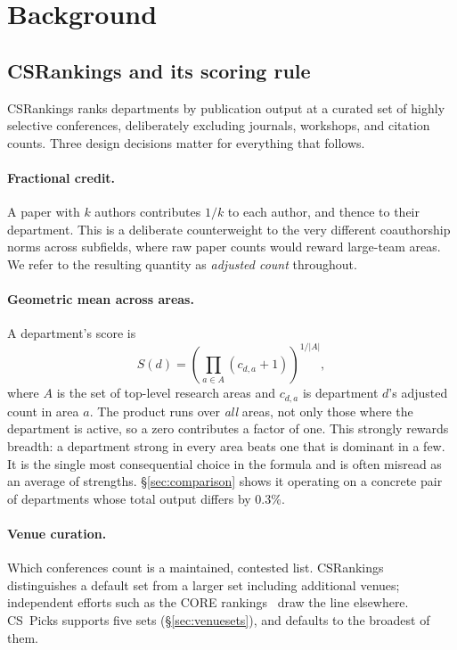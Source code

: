 \documentclass[11pt]{article}
\newcommand{\sys}{CS~Picks}
\newcommand{\csr}{CSRankings}
\begin{document}
\section{Background}
\label{sec:background}

\subsection{\csr{} and its scoring rule}

\csr{} ranks departments by publication output at a curated set of highly
selective conferences, deliberately excluding journals, workshops, and citation
counts. Three design decisions matter for everything that follows.

\paragraph{Fractional credit.} A paper with $k$ authors contributes $1/k$ to
each author, and thence to their department. This is a deliberate
counterweight to the very different coauthorship norms across subfields, where
raw paper counts would reward large-team areas. We refer to the resulting
quantity as \emph{adjusted count} throughout.

\paragraph{Geometric mean across areas.} A department's score is
\begin{equation}
  S(d) = \left( \prod_{a \in A} \left( c_{d,a} + 1 \right) \right)^{1/|A|},
  \label{eq:score}
\end{equation}
where $A$ is the set of top-level research areas and $c_{d,a}$ is department
$d$'s adjusted count in area $a$. The product runs over \emph{all} areas, not
only those where the department is active, so a zero contributes a factor of
one. This strongly rewards breadth: a department strong in every area beats one
that is dominant in a few. It is the single most consequential choice in the
formula and is often misread as an average of strengths.
\S\ref{sec:comparison} shows it operating on a concrete pair of departments
whose total output differs by 0.3\%.

\paragraph{Venue curation.} Which conferences count is a maintained,
contested list. \csr{} distinguishes a default set from a larger set including
additional venues; independent efforts such as the CORE
rankings~\cite{coreportal} draw the line elsewhere. \sys{} supports five sets
(\S\ref{sec:venuesets}), and defaults to the broadest of them.
\end{document}
